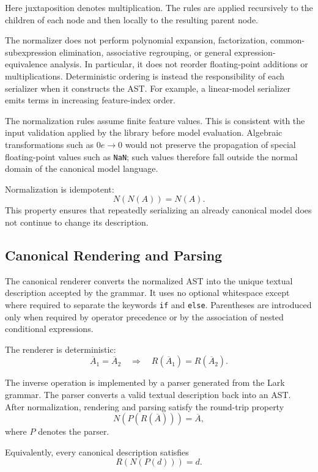 Here juxtaposition denotes multiplication. The rules are applied recursively
to the children of each node and then locally to the resulting parent node.

The normalizer does not perform polynomial expansion, factorization,
common-subexpression elimination, associative regrouping, or general
expression-equivalence analysis. In particular, it does not reorder
floating-point additions or multiplications. Deterministic ordering is instead
the responsibility of each serializer when it constructs the AST. For example,
a linear-model serializer emits terms in increasing feature-index order.

The normalization rules assume finite feature values. This is consistent with
the input validation applied by the library before model evaluation. Algebraic
transformations such as \(0e\rightarrow0\) would not preserve the propagation
of special floating-point values such as \texttt{NaN}; such values therefore
fall outside the normal domain of the canonical model language.

Normalization is idempotent:
\[
N(N(A))=N(A).
\]
This property ensures that repeatedly serializing an already canonical model
does not continue to change its description.

\subsection{Canonical Rendering and Parsing}

The canonical renderer converts the normalized AST into the unique textual
description accepted by the grammar. It uses no optional whitespace except
where required to separate the keywords \texttt{if} and \texttt{else}.
Parentheses are introduced only when required by operator precedence or by the
association of nested conditional expressions.

The renderer is deterministic:
\[
\overline{A}_1=\overline{A}_2
\quad\Longrightarrow\quad
R(\overline{A}_1)=R(\overline{A}_2).
\]

The inverse operation is implemented by a parser generated from the Lark
grammar. The parser converts a valid textual description back into an AST.
After normalization, rendering and parsing satisfy the round-trip property
\[
N\!\left(P\!\left(R(\overline{A})\right)\right)=\overline{A},
\]
where \(P\) denotes the parser.

Equivalently, every canonical description satisfies
\[
R\!\left(
N\!\left(P(d)\right)
\right)=d.
\]


